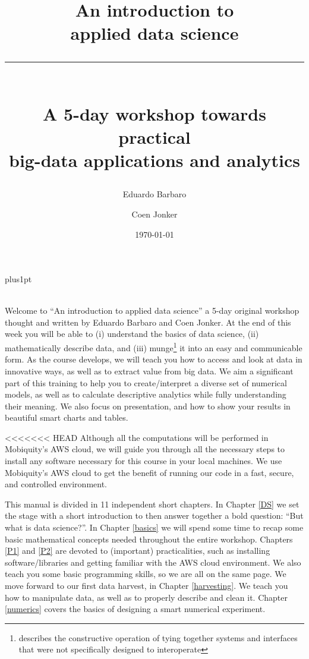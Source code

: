\documentclass[10pt]{PhDthesisPSnPDF}%
\title{\Huge{An introduction to \\ applied data science} \\ 
\rule{100mm}{5pt} \\
\Large{A 5-day workshop towards practical \\ big-data applications and analytics}}
\author{\Large{Eduardo Barbaro}}
\author{\Large{Coen Jonker}}
\affil{\normalsize Data Scientistists at Mobiquity Inc}
\date{\today}
\begin{document}
\renewcommand\baselinestretch{1}
\baselineskip=14pt plus1pt

\maketitle


 \\

Welcome to ``An introduction to applied data science'' a 5-day original workshop thought and written by Eduardo Barbaro and Coen Jonker. At the end of this week you will be able to (i) understand the basics of data science, (ii) mathematically describe data, and (iii) munge\footnote{describes the constructive operation of tying together systems and interfaces that were not specifically designed to interoperate} it into an easy and communicable form. As the course develops, we will teach you how to access and look at data in innovative ways, as well as to extract value from big data. We aim a significant part of this training to help you to create/interpret a diverse set of numerical models, as well as to calculate descriptive analytics while fully understanding their meaning. We also focus on presentation, and how to show your results in beautiful smart charts and tables.

<<<<<<< HEAD
Although all the computations will be performed in Mobiquity's AWS cloud, we will guide you through all the necessary steps to install any software necessary for this course in your local machines. We use Mobiquity's AWS cloud to get the benefit of running our code in a fast, secure, and controlled environment.

This manual is divided in 11 independent short chapters. In Chapter \ref{DS} we set the stage with a short introduction to then answer together a bold question: ``But what is data science?''. In Chapter \ref{basics} we will spend some time to recap some basic mathematical concepts needed throughout the entire workshop. Chapters \ref{P1} and \ref{P2} are devoted to (important) practicalities, such as installing software/libraries and getting familiar with the AWS cloud environment. We also teach you some basic programming skills, so we are all on the same page. We move forward to our first data harvest, in Chapter \ref{harvesting}. We teach you how to manipulate data, as well as to properly describe and clean it. Chapter \ref{numerics} covers the basics of designing a smart numerical experiment. 
\end{document}
